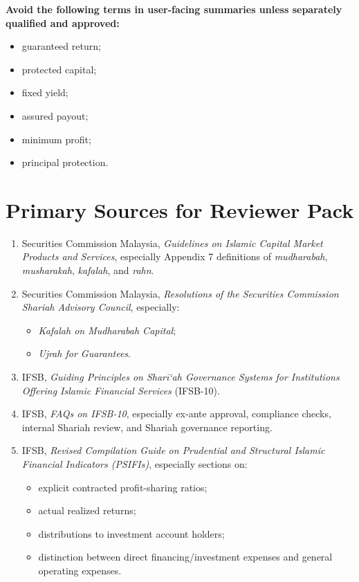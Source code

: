 \documentclass[11pt]{article}
\begin{document}
\begin{enumerate}[leftmargin=1.8em,label=\textbf{Q\arabic*.}]
    \textbf{Avoid the following terms in user-facing summaries unless separately qualified and approved:}
    \begin{itemize}[leftmargin=1.5em]
        \item guaranteed return;
        \item protected capital;
        \item fixed yield;
        \item assured payout;
        \item minimum profit;
        \item principal protection.
    \end{itemize}
\end{enumerate}

\section*{Primary Sources for Reviewer Pack}

\begin{enumerate}[leftmargin=1.8em]
    \item Securities Commission Malaysia, \emph{Guidelines on Islamic Capital Market Products and Services}, especially Appendix 7 definitions of \emph{mudharabah}, \emph{musharakah}, \emph{kafalah}, and \emph{rahn}.
    \item Securities Commission Malaysia, \emph{Resolutions of the Securities Commission Shariah Advisory Council}, especially:
    \begin{itemize}[leftmargin=1.5em]
        \item \emph{Kafalah on Mudharabah Capital};
        \item \emph{Ujrah for Guarantees}.
    \end{itemize}
    \item IFSB, \emph{Guiding Principles on Sharī`ah Governance Systems for Institutions Offering Islamic Financial Services} (IFSB-10).
    \item IFSB, \emph{FAQs on IFSB-10}, especially ex-ante approval, compliance checks, internal Shariah review, and Shariah governance reporting.
    \item IFSB, \emph{Revised Compilation Guide on Prudential and Structural Islamic Financial Indicators (PSIFIs)}, especially sections on:
    \begin{itemize}[leftmargin=1.5em]
        \item explicit contracted profit-sharing ratios;
        \item actual realized returns;
        \item distributions to investment account holders;
        \item distinction between direct financing/investment expenses and general operating expenses.
    \end{itemize}
\end{enumerate}
\end{document}

